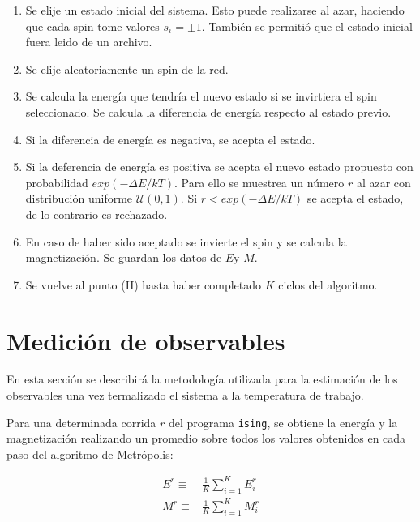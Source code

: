 \documentclass[a4paper,12pt]{article}
\begin{document}
\renewcommand{\theenumi}{\roman{enumi}}
\begin{enumerate}
	\item Se elije un estado inicial del sistema. Esto puede realizarse al 
	azar, haciendo que cada spin tome valores $s_i=\pm1$. También se permitió 
	que el estado inicial fuera leido de un archivo.
	\item Se elije aleatoriamente un spin de la red.
	\item Se calcula la energía que tendría el nuevo estado si se invirtiera el 
	spin seleccionado. Se calcula la diferencia de energía respecto al estado 
	previo.
	\item Si la diferencia de energía es negativa, se acepta el estado. 
	\item Si la deferencia de energía es positiva se acepta el nuevo estado 
	propuesto con probabilidad $exp(-\Delta E/kT)$. Para ello se muestrea un 
	número $r$ al azar con distribución uniforme $\mathcal{U}(0,1)$. Si $r< 
	exp(-\Delta E/kT)$ se acepta el estado, de lo contrario es rechazado.
    \item En caso de haber sido aceptado se invierte el spin y se 
    calcula la magnetización. Se guardan los datos de $E$y $M$.
    \item Se vuelve al punto (\textrm{II}) hasta haber completado $K$ ciclos 
    del 
    algoritmo.
\end{enumerate}

\section{Medición de observables}

En esta sección se describirá la metodología utilizada para la estimación de 
los observables una vez termalizado el sistema a la temperatura de trabajo.

Para una determinada corrida $r$ del programa \texttt{ising}, se obtiene la 
energía y la magnetización realizando un promedio sobre todos los valores 
obtenidos en cada paso del algoritmo de Metrópolis:

\begin{subequations}
   \begin{align}
  E^r \equiv &\frac{1}{K}\sum_{i=1}^K E^r_i 
  \label{eq:E_prom}\\
  M^r \equiv & \frac{1}{K}\sum_{i=1}^K M^r_i 
  \label{eq:M_prom}
   \end{align}
\end{subequations}
\end{document}
